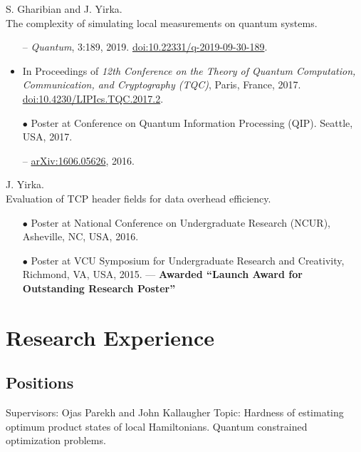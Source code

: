 \documentclass[11pt,letterpaper,serif]{moderncv}
\newcommand{\pubItemSep}{0em}
\begin{document}
S. Gharibian and J. Yirka.
\\The complexity of simulating local measurements on quantum systems.
\begin{adjustwidth}{.1in}{}
	\begin{itemize}[itemsep=\pubItemSep]
		\item[--] \textit{Quantum}, 3:189, 2019. \quad
		\href{https://doi.org/10.22331/q-2019-09-30-189}{doi:10.22331/q-2019-09-30-189}.
		\item In Proceedings of \textit{12th Conference on the Theory of Quantum Computation, Communication,
		and Cryptography (TQC)}, Paris, France, 2017. \quad
		\href{https://doi.org/10.4230/LIPIcs.TQC.2017.2}{doi:10.4230/LIPIcs.TQC.2017.2}.
		\item[$\bullet$] Poster at Conference on Quantum Information Processing (QIP). Seattle, USA, 2017.
		\item[--] \href{https://arxiv.org/abs/1606.05626}{arXiv:1606.05626}, 2016.
	\end{itemize}
\end{adjustwidth}
\vspace{\parsep}

J. Yirka.
\\Evaluation of TCP header fields for data overhead efficiency.
\begin{adjustwidth}{.1in}{}
	\begin{itemize}[itemsep=\pubItemSep]
		\item[$\bullet$] Poster at National Conference on Undergraduate Research (NCUR), Asheville, NC, USA, 2016.
		\item[$\bullet$] Poster at VCU Symposium for Undergraduate Research and Creativity, Richmond, VA, USA, 2015. --- \textbf{Awarded ``Launch Award for Outstanding Research Poster''}
	\end{itemize}
\end{adjustwidth}


\section{Research Experience}
\subsection{Positions}
{
	\begin{adjustwidth}{.25in}{}
		Supervisors: Ojas Parekh and John Kallaugher \newline
		Topic: Hardness of estimating optimum product states of local Hamiltonians. Quantum constrained optimization problems.
	\end{adjustwidth}
}
\end{document}
